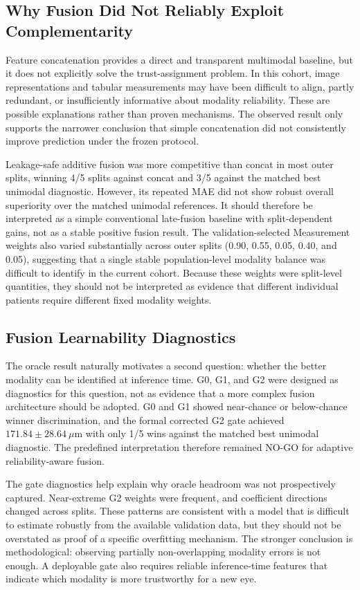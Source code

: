 \documentclass[10pt,twocolumn]{article}
\begin{document}
\subsection{Why Fusion Did Not Reliably Exploit Complementarity}

Feature concatenation provides a direct and transparent multimodal baseline, but it does not explicitly solve the trust-assignment problem. In this cohort, image representations and tabular measurements may have been difficult to align, partly redundant, or insufficiently informative about modality reliability. These are possible explanations rather than proven mechanisms. The observed result only supports the narrower conclusion that simple concatenation did not consistently improve prediction under the frozen protocol.

Leakage-safe additive fusion was more competitive than concat in most outer splits, winning 4/5 splits against concat and 3/5 against the matched best unimodal diagnostic. However, its repeated MAE did not show robust overall superiority over the matched unimodal references. It should therefore be interpreted as a simple conventional late-fusion baseline with split-dependent gains, not as a stable positive fusion result. The validation-selected Measurement weights also varied substantially across outer splits (0.90, 0.55, 0.05, 0.40, and 0.05), suggesting that a single stable population-level modality balance was difficult to identify in the current cohort. Because these weights were split-level quantities, they should not be interpreted as evidence that different individual patients require different fixed modality weights.

\subsection{Fusion Learnability Diagnostics}

The oracle result naturally motivates a second question: whether the better modality can be identified at inference time. G0, G1, and G2 were designed as diagnostics for this question, not as evidence that a more complex fusion architecture should be adopted. G0 and G1 showed near-chance or below-chance winner discrimination, and the formal corrected G2 gate achieved $171.84 \pm 28.64~\mu$m with only 1/5 wins against the matched best unimodal diagnostic. The predefined interpretation therefore remained NO-GO for adaptive reliability-aware fusion.

The gate diagnostics help explain why oracle headroom was not prospectively captured. Near-extreme G2 weights were frequent, and coefficient directions changed across splits. These patterns are consistent with a model that is difficult to estimate robustly from the available validation data, but they should not be overstated as proof of a specific overfitting mechanism. The stronger conclusion is methodological: observing partially non-overlapping modality errors is not enough. A deployable gate also requires reliable inference-time features that indicate which modality is more trustworthy for a new eye.
\end{document}
